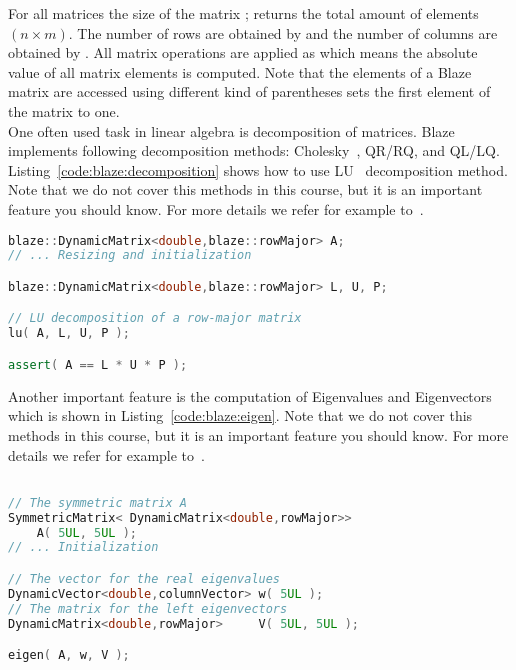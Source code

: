 For all matrices the size of the matrix ; returns the total amount of elements $(n \times m)$. The number of rows are obtained by  and the number of columns are obtained by . All matrix operations are applied as  which means the absolute value of all matrix elements is computed. Note that the elements of a Blaze matrix are accessed using different kind of parentheses  sets the first element of the matrix to one.\\

One often used task in linear algebra is decomposition of matrices. Blaze implements following decomposition methods: Cholesky~\cite{cholesky2005resolution}, QR/RQ, and QL/LQ. Listing~\ref{code:blaze:decomposition} shows how to use LU~\cite{bunch1974triangular} decomposition method. Note that we do not cover this methods in this course, but it is an important feature you should know. For more details we refer for example to~\cite{press1992numerical}.

\begin{lstlisting}[language=c++,caption={Matrix decomposition methods in Blaze\label{code:blaze:decomposition}},float,floatplacement=tb]
blaze::DynamicMatrix<double,blaze::rowMajor> A;
// ... Resizing and initialization

blaze::DynamicMatrix<double,blaze::rowMajor> L, U, P;

// LU decomposition of a row-major matrix
lu( A, L, U, P );  

assert( A == L * U * P );
\end{lstlisting}

Another important feature is the computation of Eigenvalues and Eigenvectors which is shown in Listing~\ref{code:blaze:eigen}.  Note that we do not cover this methods in this course, but it is an important feature you should know. For more details we refer for example to~\cite{press1992numerical}. 

\begin{lstlisting}[language=c++,caption={Matrix decomposition methods in Blaze\label{code:blaze:eigen}},float,floatplacement=tb]

// The symmetric matrix A
SymmetricMatrix< DynamicMatrix<double,rowMajor>> 
    A( 5UL, 5UL );  
// ... Initialization

// The vector for the real eigenvalues
DynamicVector<double,columnVector> w( 5UL );    
// The matrix for the left eigenvectors   
DynamicMatrix<double,rowMajor>     V( 5UL, 5UL );  

eigen( A, w, V );
\end{lstlisting}







